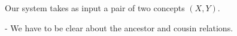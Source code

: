 Our system takes as input a pair of two concepts $(X,Y)$.

- We have to be clear about the ancestor and cousin relations.


